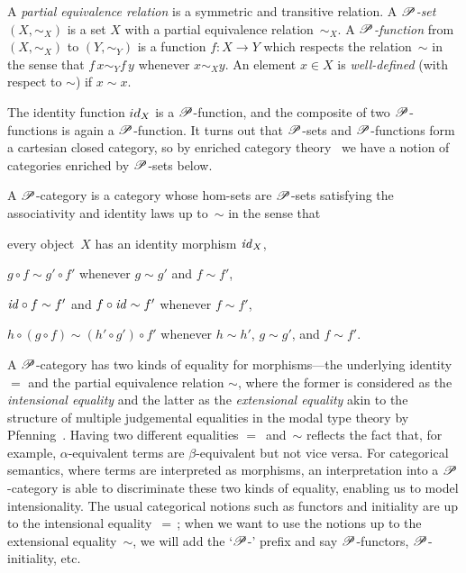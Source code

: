\documentclass[a4paper,UKenglish,numberwithinsect,cleveref,thm-restate]{lipics-v2021}
\numberwithin{equation}{section}
\theoremstyle{definition}
\theoremstyle{plain}
\begin{document}
\begin{definition}
  A \emph{partial equivalence relation} is a symmetric and transitive relation.
  A \emph{$\mathscr{P}$-set} $(X, \sim_X)$ is a set $X$ with a partial equivalence relation~$\sim_X$.
  A \emph{$\mathscr{P}$-function} from $(X, \sim_X)$ to $(Y, \sim_Y)$ is a function $f\colon X \to Y$ which respects the relation~$\sim$ in the sense that $f\,x \sim_Y f\,y$ whenever $x \sim_X y$.
  An element $x \in X$ is \emph{well-defined} (with respect to $\sim$) if $x \sim x$.
\end{definition}
The identity function $\idfunc[X]$ is a $\mathscr{P}$-function, and the composite of two $\mathscr{P}$-functions is again a $\mathscr{P}$-function.
It turns out that $\mathscr{P}$-sets and $\mathscr{P}$-functions form a cartesian closed category, so by enriched category theory~\cite{Kelly1982} we have a notion of categories enriched by $\mathscr{P}$-sets below.

\begin{definition}
  A $\mathscr{P}$-category is a category whose hom-sets are $\mathscr{P}$-sets satisfying the associativity and identity laws up to~$\sim$ in the sense that 
  \begin{romanenumerate}
  \item every object~$X$ has an identity morphism $\mathit{id}_X$, 
  \item $g \circ f \sim g' \circ f'$ whenever $g\sim g'$ and $f \sim f'$,
  \item $\mathit{id} \circ f \sim f'$ and $f \circ \mathit{id} \sim f'$ whenever $f \sim f'$,
  \item $h \circ (g \circ f) \sim (h' \circ g') \circ f'$ whenever $h\sim h'$, $g \sim g'$, and $f \sim f'$.
  \end{romanenumerate}
\end{definition}

A $\mathscr{P}$-category has two kinds of equality for morphisms---the underlying identity $=$ and the partial equivalence relation $\sim$, where the former is considered as the \emph{intensional equality} and the latter as the \emph{extensional equality} akin to the structure of multiple judgemental equalities in the modal type theory by Pfenning~\cite{Pfenning2002a}.
Having two different equalities $=$~and~$\sim$ reflects the fact that, for example, $\alpha$-equivalent terms are $\beta$-equivalent but not vice versa.
For categorical semantics, where terms are interpreted as morphisms, an interpretation into a $\mathscr{P}$-category is able to discriminate these two kinds of equality, enabling us to model intensionality.
The usual categorical notions such as functors and initiality are up to the intensional equality~$=$\,; when we want to use the notions up to the extensional equality~$\sim$, we will add the `$\mathscr{P}$-' prefix and say $\mathscr{P}$-functors, $\mathscr{P}$-initiality, etc.
\end{document}
